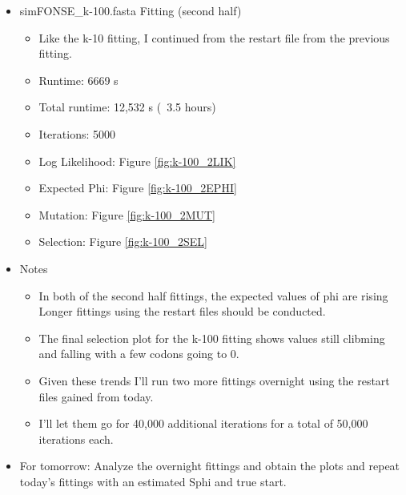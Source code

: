 \documentclass[11pt]{labbook}
\begin{document}
\begin{itemize}
\begin{itemize}
\begin{itemize}
                    \end{itemize}
                \item simFONSE\_k-100.fasta Fitting (second half)
                    \begin{itemize}
                        \item Like the k-10 fitting, I continued from the restart file from the previous fitting.
                        \item Runtime: 6669 s
                        \item Total runtime: 12,532 s (~3.5 hours)
                        \item Iterations: 5000
                        \item Log Likelihood: Figure \ref{fig:k-100_2LIK}
                        \item Expected Phi: Figure \ref{fig:k-100_2EPHI}
                        \item Mutation: Figure \ref{fig:k-100_2MUT}
                        \item Selection: Figure \ref{fig:k-100_2SEL}
                    \end{itemize}
                \item Notes
                    \begin{itemize}
                        \item In both of the second half fittings, the expected values of phi are rising
                        Longer fittings using the restart files should be conducted.
                        \item The final selection plot for the k-100 fitting shows values still clibming and falling with a few codons going to 0.
                        \item Given these trends I'll run two more fittings overnight using the restart files gained from today.
                        \item I'll let them go for 40,000 additional iterations for a total of 50,000 iterations each.
                    \end{itemize}
                \item For tomorrow: Analyze the overnight fittings and obtain the plots and repeat today's fittings with an estimated Sphi and true start.
            \end{itemize}
    \end{itemize}
    
\end{document}
